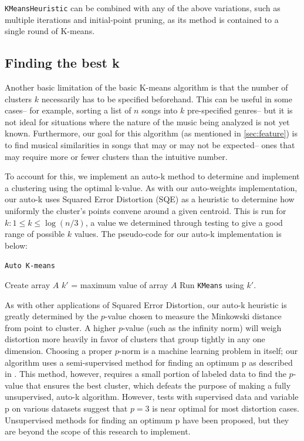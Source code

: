 \documentclass[12pt,twocolumn,titlepage]{article}
\begin{document}
\texttt{KMeansHeuristic} can be combined with any of the above variations, such as multiple iterations and initial-point pruning, as its method is contained to a single round of K-means.

\subsection{Finding the best k}

Another basic limitation of the basic K-means algorithm is that the number of clusters $k$ necessarily has to be specified beforehand. This can be useful in some cases-- for example, sorting a list of $n$ songs into $k$ pre-specified genres-- but it is not ideal for situations where the nature of the music being analyzed is not yet known. Furthermore, our goal for this algorithm (as mentioned in \ref{sec:feature}) is to find musical similarities in songs that may or may not be expected-- ones that may require more or fewer clusters than the intuitive number. 


To account for this, we implement an auto-k method to determine and implement a clustering using the optimal k-value. As with our auto-weights implementation, our auto-k uses Squared Error Distortion (SQE) as a heuristic to determine how uniformly the cluster's points convene around a given centroid. This is run for $k: 1 \leq k \leq \log({n / 3})$, a value we determined through testing to give a good range of possible $k$ values. The pseudo-code for our auto-k implementation is below: 

\begin{algorithm}
 \caption{\texttt{Auto K-means}}\label{algoCPOR3}
 Create array $A$\;
 $k'$ = maximum value of array $A$\;
 Run \texttt{KMeans} using $k'$.
\end{algorithm}

As with other applications of Squared Error Distortion, our auto-k heuristic is greatly determined by the $p$-value chosen to measure the Minkowski distance from point to cluster. A higher $p$-value (such as the infinity norm) will weigh distortion more heavily in favor of clusters that group tightly in any one dimension. Choosing a proper $p$-norm is a machine learning problem in itself; our algorithm uses a semi-supervised method for finding an optimum p as described in \cite{SemiSupPNorm}. This method, however, requires a small portion of labeled data to find the $p$-value that ensures the best cluster, which defeats the purpose of making a fully unsupervised, auto-k algorithm. However, tests with supervised data and variable p on various datasets suggest that $p = 3$ is near optimal for most distortion cases. Unsupervised methods for finding an optimum p have been proposed, \cite{SemiSupPNorm} but they are beyond the scope of this research to implement. 
\end{document}
